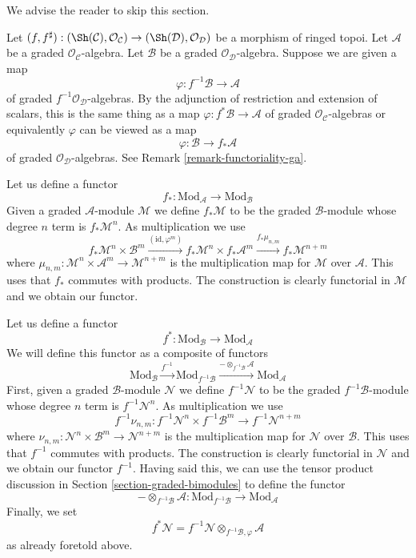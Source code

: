 \noindent
We advise the reader to skip this section.

\medskip\noindent
Let $(f, f^\sharp) : (\Sh(\mathcal{C}), \mathcal{O}_\mathcal{C})
\to (\Sh(\mathcal{D}), \mathcal{O}_\mathcal{D})$
be a morphism of ringed topoi. Let $\mathcal{A}$ be a
graded $\mathcal{O}_\mathcal{C}$-algebra. Let $\mathcal{B}$ be a
graded $\mathcal{O}_\mathcal{D}$-algebra.
Suppose we are given a map
$$
\varphi : f^{-1}\mathcal{B} \to \mathcal{A}
$$
of graded $f^{-1}\mathcal{O}_\mathcal{D}$-algebras.
By the adjunction of restriction and extension of scalars, this
is the same thing as a map $\varphi : f^*\mathcal{B} \to \mathcal{A}$
of graded $\mathcal{O}_\mathcal{C}$-algebras or equivalently
$\varphi$ can be viewed as a map
$$
\varphi : \mathcal{B} \to f_*\mathcal{A}
$$
of graded $\mathcal{O}_\mathcal{D}$-algebras.
See Remark \ref{remark-functoriality-ga}.

\medskip\noindent
Let us define a functor
$$
f_* :
\text{Mod}_\mathcal{A}
\longrightarrow
\text{Mod}_\mathcal{B}
$$
Given a graded $\mathcal{A}$-module $\mathcal{M}$ we define
$f_*\mathcal{M}$ to be the graded $\mathcal{B}$-module
whose degree $n$ term is $f_*\mathcal{M}^n$. As multiplication
we use
$$
f_*\mathcal{M}^n \times \mathcal{B}^m
\xrightarrow{(\text{id}, \varphi^m)}
f_*\mathcal{M}^n \times f_*\mathcal{A}^m
\xrightarrow{f_*\mu_{n, m}}
f_*\mathcal{M}^{n + m}
$$
where $\mu_{n, m} : \mathcal{M}^n \times \mathcal{A}^m
\to \mathcal{M}^{n + m}$ is the multiplication map for $\mathcal{M}$
over $\mathcal{A}$. This uses that $f_*$ commutes with products.
The construction is clearly functorial in
$\mathcal{M}$ and we obtain our functor.

\medskip\noindent
Let us define a functor
$$
f^* :
\text{Mod}_\mathcal{B}
\longrightarrow
\text{Mod}_\mathcal{A}
$$
We will define this functor as a composite of functors
$$
\text{Mod}_\mathcal{B}
\xrightarrow{f^{-1}}
\text{Mod}_{f^{-1}\mathcal{B}}
\xrightarrow{ - \otimes_{f^{-1}\mathcal{B}} \mathcal{A}}
\text{Mod}_\mathcal{A}
$$
First, given a graded $\mathcal{B}$-module $\mathcal{N}$ we define
$f^{-1}\mathcal{N}$ to be the graded $f^{-1}\mathcal{B}$-module
whose degree $n$ term is $f^{-1}\mathcal{N}^n$. As multiplication
we use
$$
f^{-1}\nu_{n, m} :
f^{-1}\mathcal{N}^n \times f^{-1}\mathcal{B}^m
\longrightarrow
f^{-1}\mathcal{N}^{n + m}
$$
where $\nu_{n, m} : \mathcal{N}^n \times \mathcal{B}^m
\to \mathcal{N}^{n + m}$ is the multiplication map for $\mathcal{N}$
over $\mathcal{B}$. This uses that $f^{-1}$ commutes with products.
The construction is clearly functorial in
$\mathcal{N}$ and we obtain our functor $f^{-1}$.
Having said this, we can use the tensor
product discussion in Section \ref{section-graded-bimodules}
to define the functor
$$
- \otimes_{f^{-1}\mathcal{B}} \mathcal{A} :
\text{Mod}_{f^{-1}\mathcal{B}}
\longrightarrow
\text{Mod}_\mathcal{A}
$$
Finally, we set
$$
f^*\mathcal{N} =
f^{-1}\mathcal{N} \otimes_{f^{-1}\mathcal{B}, \varphi} \mathcal{A}
$$
as already foretold above.

